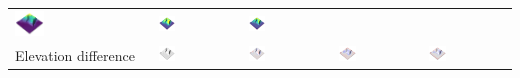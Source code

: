 \documentclass[prodmode,acmtochi]{acmsmall} %
\begin{document}
\begin{table}
{\begin{tabular}{m{} m{} m{} m{} m{}}
\includegraphics[width=0.22\textwidth]{images/render_3d/stdev_dem_1.png} &
\includegraphics[width=0.22\textwidth]{images/render_3d/stdev_dem_2.png} &
\includegraphics[width=0.22\textwidth]{images/render_3d/stdev_dem_3.png}\\
%
Elevation difference &
\includegraphics[width=0.22\textwidth]{images/render_3d/dem_difference_1.png} &
\includegraphics[width=0.22\textwidth]{images/render_3d/mean_dem_regression_difference_1.png} &
\includegraphics[width=0.22\textwidth]{images/render_3d/mean_dem_regression_difference_2.png} &
\includegraphics[width=0.22\textwidth]{images/render_3d/mean_dem_regression_difference_3.png}\\

\end{tabular}}
\end{table}
\end{document}
